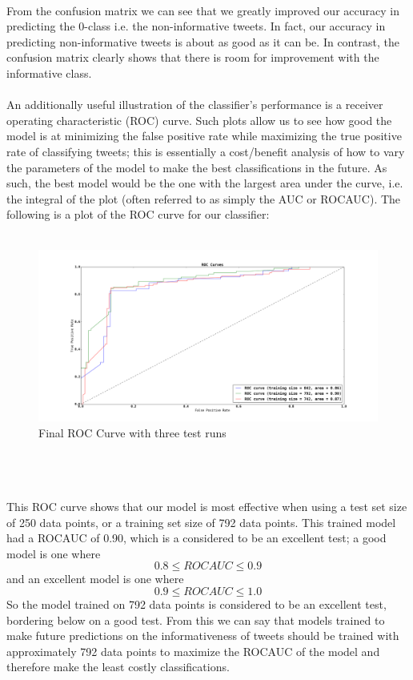 \documentclass[12pt]{article}
\begin{document}
\\
From the confusion matrix we can see that we greatly improved our accuracy in predicting the $0$-class i.e. the non-informative tweets. In fact, our accuracy in predicting non-informative tweets is about as good as it can be. In contrast, the confusion matrix clearly shows that there is room for improvement with the informative class. 
\\
\\
An additionally useful illustration of the classifier's performance is a receiver operating characteristic (ROC) curve. Such plots allow us to see how good the model is at minimizing the false positive rate while maximizing the true positive rate of classifying tweets; this is essentially a cost/benefit analysis of how to vary the parameters of the model to make the best classifications in the future. As such, the best model would be the one with the largest area under the curve, i.e. the integral of the plot (often referred to as simply the AUC or ROCAUC). The following is a plot of the ROC curve for our classifier: \\
\\
\begin{figure}[h]
\centering
\includegraphics[width=16cm]{final_roc.png}
\caption{Final ROC Curve with three test runs}
\label{fig:roc}
\end{figure}\\
\\
\\
This ROC curve shows that our model is most effective when using a test set size of 250 data points, or a training set size of 792 data points. This trained model had a ROCAUC of 0.90, which is a considered to be an excellent test; a good model is one where 
\[0.8 \le ROCAUC \le 0.9\] 
and an excellent model is one where 
\[0.9 \le ROCAUC \le 1.0\] 
So the model trained on 792 data points is considered to be an excellent test, bordering below on a good test. \cite{rocarea}
From this we can say that models trained to make future predictions on the informativeness of tweets should be trained with approximately 792 data points to maximize the ROCAUC of the model and therefore make the least costly classifications. 
\end{document}
